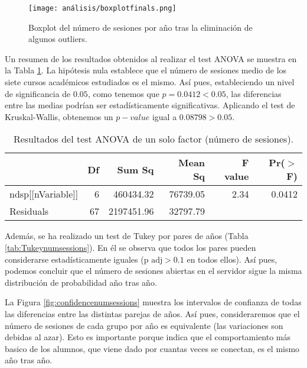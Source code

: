 \begin{figure}[H]
    \centering
    \texttt{[image: análisis/boxplotfinals.png]}
    \caption{Boxplot del número de sesiones por año tras la eliminación de algunos outliers.}
    \label{fig:boxplotsessionsyear}
\end{figure}

Un resumen de los resultados obtenidos al realizar el test ANOVA se muestra en la Tabla \ref{tab:ANOVAnumsessions}. La hipótesis nula establece que el número de sesiones medio de los siete cursos académicos estudiados es el mismo. Así pues, estableciendo un nivel de significancia de $0.05$, como tenemos que $p = 0.0412 < 0.05$, las diferencias entre las medias podrían ser estadísticamente significativas. Aplicando el test de Kruskal-Wallis, obtenemos un $p-value$ igual a $0.08798 > 0.05$.

\begin{table}[H]
\centering
\caption{Resultados del test ANOVA de un solo factor (número de sesiones).}
\label{tab:ANOVAnumsessions}
\begin{tabular}{lrrrrr}
  \hline
 & Df & Sum Sq & Mean Sq & F value & Pr($>$F) \\ 
  \hline
ndsp[[nVariable]] & 6 & 460434.32 & 76739.05 & 2.34 & 0.0412 \\ 
  Residuals         & 67 & 2197451.96 & 32797.79 &  &  \\ 
   \hline
\end{tabular}
\end{table}

Además, se ha realizado un test de Tukey por pares de años (Tabla \ref{tab:Tukeynumsessions}). En él se observa que todos los pares pueden considerarse estadísticamente iguales ($\text{p adj} > 0.1$ en todos ellos). Así pues, podemos concluir que el número de sesiones abiertas en el servidor sigue la misma distribución de probabilidad año tras año.

La Figura \ref{fig:confidencenumsessions} muestra los intervalos de confianza de todas las diferencias entre las distintas parejas de años. Así pues, consideraremos que el número de sesiones de cada grupo por año es equivalente (las variaciones son debidas al azar). Esto es importante porque indica que el comportamiento más basico de los alumnos, que viene dado por cuantas veces se conectan, es el mismo año tras año.

